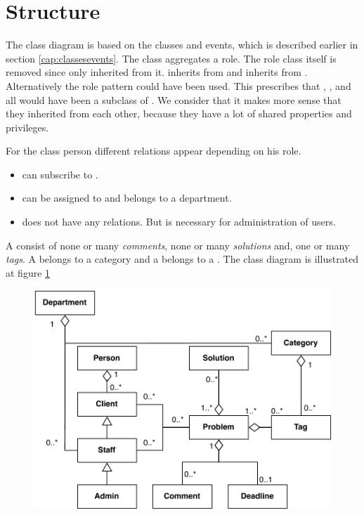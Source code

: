 \section{Structure}
\label{sec:problem_structure}
The class diagram is based on the classes and events, which is described earlier in section \ref{cap:classesevents}. The class  aggregates a role. The role class itself is removed since only \class{\client[]} inherited from it. \class{\staff[]} inherits from \class{\client[]} and \class{\admin[]} inherits from \cl{\staff[]}. Alternatively the role pattern could have been used. This prescribes that \class{\client[]}, \class{\staff[]}, and \class{\admin[]} all would have been a subclass of \textit{}  \cite[p. 80]{roedeaalborg}. We consider that it makes more sense that they inherited from each other, because they have a lot of shared properties and privileges.

For the class person different relations appear depending on his role. 
\begin{itemize}
\item {} can subscribe to .
\item \class{\staff[]} can be assigned to  and \class{\staff[]} belongs to a department. 
\item \class{\admin[]} does not have any relations. But is necessary for administration of users.  
\end{itemize}

A \problem[] consist of none or many \textit{comments}, none or many \textit{solutions} and, one or many \textit{tags}. A  belongs to a category and a  belongs to a .  The class diagram is illustrated at figure \ref{fig:pdaclassdiagram}

\begin{figure}
\begin{center}
\includegraphics[scale=0.6]{input/problem_domain_analysis/newest_class_diagram.pdf}
\label{fig:pdaclassdiagram}
\end{center}
\end{figure}